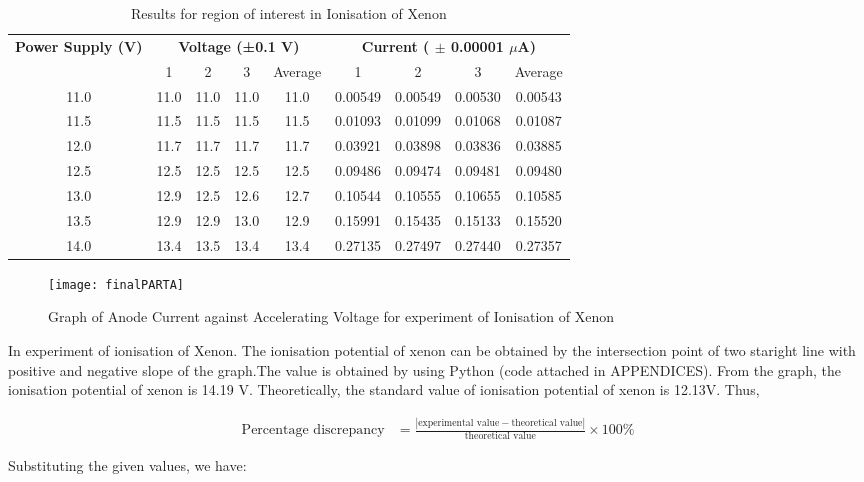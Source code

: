 \documentclass[a4paper,11pt]{article}
\begin{document}
\begin{table}[h!]
\small
\centering
\begin{tabular}{ccccccccc}
\toprule
\multicolumn{1}{c}{\textbf{Power Supply (V)}} & \multicolumn{4}{c}{\textbf{Voltage (±0.1 V)}} & \multicolumn{4}{c}{\textbf{Current ( $\pm$ 0.00001 $\mu$A)}} \\
\cmidrule(lr){2-5} \cmidrule(lr){6-9}
& 1 & 2 & 3 & Average & 1 & 2 & 3 & Average \\
\midrule
11.0 & 11.0 & 11.0 & 11.0 & 11.0 & 0.00549 & 0.00549 & 0.00530 & 0.00543 \\
11.5 & 11.5 & 11.5 & 11.5 & 11.5 & 0.01093 & 0.01099 & 0.01068 & 0.01087 \\
12.0 & 11.7 & 11.7 & 11.7 & 11.7 & 0.03921 & 0.03898 & 0.03836 & 0.03885 \\
12.5 & 12.5 & 12.5 & 12.5 & 12.5 & 0.09486 & 0.09474 & 0.09481 & 0.09480 \\
13.0 & 12.9 & 12.5 & 12.6 & 12.7 & 0.10544 & 0.10555 & 0.10655 & 0.10585 \\
13.5 & 12.9 & 12.9 & 13.0 & 12.9 & 0.15991 & 0.15435 & 0.15133 & 0.15520 \\
14.0 & 13.4 & 13.5 & 13.4 & 13.4 & 0.27135 & 0.27497 & 0.27440 & 0.27357 \\
\hline
\end{tabular}
\caption{Results for region of interest in Ionisation of Xenon}
\label{table:measurements}
\end{table}

\begin{figure}[h!]
\centering
\texttt{[image: finalPARTA]}
\caption{Graph of Anode Current against Accelerating Voltage for experiment of Ionisation of Xenon}
\label{3}
\end{figure}
\newpage

In experiment of ionisation of Xenon. The ionisation potential of xenon can be obtained by the intersection point of  two staright line with positive and negative slope of the graph.The value is obtained by using Python (code attached in APPENDICES).
From the graph, the ionisation potential of xenon is 14.19 V.
Theoretically, the standard value of ionisation potential of xenon is 12.13V.
Thus,

\begin{align*}
\text{Percentage discrepancy} &= \frac{|\text{experimental value} - \text{theoretical value}|}{\text{theoretical value}} \times 100\%
\end{align*}

Substituting the given values, we have:
\end{document}
